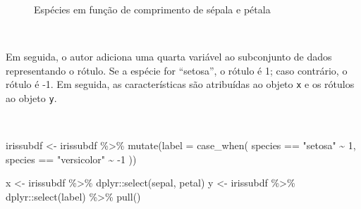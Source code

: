 \documentclass[
  a4paperpaper,
]{article}
\newenvironment{Shaded}{\begin{snugshade}}{\end{snugshade}}
\newcommand{\AttributeTok}[1]{\textcolor[rgb]{0.40,0.45,0.13}{#1}}
\newcommand{\DecValTok}[1]{\textcolor[rgb]{0.68,0.00,0.00}{#1}}
\newcommand{\FunctionTok}[1]{\textcolor[rgb]{0.28,0.35,0.67}{#1}}
\newcommand{\NormalTok}[1]{\textcolor[rgb]{0.00,0.23,0.31}{#1}}
\newcommand{\OtherTok}[1]{\textcolor[rgb]{0.00,0.23,0.31}{#1}}
\newcommand{\SpecialCharTok}[1]{\textcolor[rgb]{0.37,0.37,0.37}{#1}}
\newcommand{\StringTok}[1]{\textcolor[rgb]{0.13,0.47,0.30}{#1}}
\begin{document}
\begin{figure}[H]


\caption{\label{fig-plotsubsetiris}Espécies em função de comprimento de
sépala e pétala}

\end{figure}%

~

Em seguida, o autor adiciona uma quarta variável ao subconjunto de dados
representando o rótulo. Se a espécie for ``setosa'', o rótulo é 1; caso
contrário, o rótulo é -1. Em seguida, as características são atribuídas
ao objeto \texttt{x} e os rótulos ao objeto \texttt{y}.

~

\begin{Shaded}
\begin{Highlighting}[]
\NormalTok{irissubdf }\OtherTok{\textless{}{-}}\NormalTok{ irissubdf }\SpecialCharTok{\%\textgreater{}\%}
  \FunctionTok{mutate}\NormalTok{(}\AttributeTok{label =} \FunctionTok{case\_when}\NormalTok{(}
\NormalTok{    species }\SpecialCharTok{==} \StringTok{"setosa"} \SpecialCharTok{\textasciitilde{}} \DecValTok{1}\NormalTok{,}
\NormalTok{    species }\SpecialCharTok{==} \StringTok{"versicolor"} \SpecialCharTok{\textasciitilde{}} \SpecialCharTok{{-}}\DecValTok{1}
\NormalTok{  ))}

\NormalTok{x }\OtherTok{\textless{}{-}}\NormalTok{ irissubdf }\SpecialCharTok{\%\textgreater{}\%}\NormalTok{ dplyr}\SpecialCharTok{::}\FunctionTok{select}\NormalTok{(sepal, petal)}
\NormalTok{y }\OtherTok{\textless{}{-}}\NormalTok{ irissubdf }\SpecialCharTok{\%\textgreater{}\%}\NormalTok{ dplyr}\SpecialCharTok{::}\FunctionTok{select}\NormalTok{(label) }\SpecialCharTok{\%\textgreater{}\%} \FunctionTok{pull}\NormalTok{()}
\end{Highlighting}
\end{Shaded}
\end{document}
